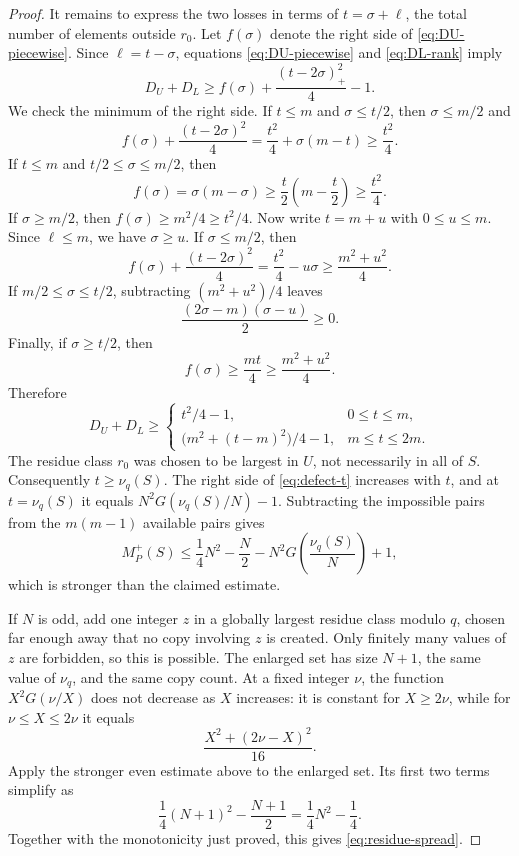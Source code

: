 \documentclass[11pt]{article}
\numberwithin{equation}{section}
\theoremstyle{remark}
\begin{document}
\begin{proof}
It remains to express the two losses in terms of
$t=\sigma+\ell$, the total number of elements outside $r_0$.  Let
$f(\sigma)$ denote the right side of \eqref{eq:DU-piecewise}.  Since
$\ell=t-\sigma$, equations \eqref{eq:DU-piecewise} and
\eqref{eq:DL-rank} imply
\[
 D_U+D_L\ge f(\sigma)+\frac{(t-2\sigma)_+^2}{4}-1.
\]
We check the minimum of the right side.
If $t\le m$ and $\sigma\le t/2$, then $\sigma\le m/2$ and
\[
 f(\sigma)+\frac{(t-2\sigma)^2}{4}
 =\frac{t^2}{4}+\sigma(m-t)\ge\frac{t^2}{4}.
\]
If $t\le m$ and $t/2\le\sigma\le m/2$, then
\[
 f(\sigma)=\sigma(m-\sigma)
 \ge \frac t2\left(m-\frac t2\right)
 \ge\frac{t^2}{4}.
\]
If $\sigma\ge m/2$, then $f(\sigma)\ge m^2/4\ge t^2/4$.
Now write $t=m+u$ with $0\le u\le m$.  Since $\ell\le m$, we have
$\sigma\ge u$.  If $\sigma\le m/2$, then
\[
 f(\sigma)+\frac{(t-2\sigma)^2}{4}
 =\frac{t^2}{4}-u\sigma
 \ge\frac{m^2+u^2}{4}.
\]
If $m/2\le\sigma\le t/2$, subtracting $(m^2+u^2)/4$ leaves
\[
 \frac{(2\sigma-m)(\sigma-u)}2\ge0.
\]
Finally, if $\sigma\ge t/2$, then
\[
 f(\sigma)\ge\frac{mt}{4}
 \ge\frac{m^2+u^2}{4}.
\]
Therefore
\begin{equation}\label{eq:defect-t}
 D_U+D_L\ge
 \begin{cases}
 t^2/4-1,&0\le t\le m,\\[1mm]
 \bigl(m^2+(t-m)^2\bigr)/4-1,&m\le t\le2m.
 \end{cases}
\end{equation}
The residue class $r_0$ was chosen to be largest in $U$, not necessarily in
all of $S$.  Consequently $t\ge\nu_q(S)$.  The right side of
\eqref{eq:defect-t} increases with $t$, and at $t=\nu_q(S)$ it equals
$N^2G(\nu_q(S)/N)-1$.  Subtracting the impossible pairs from the
$m(m-1)$ available pairs gives
\[
 M_P^+(S)
 \le \frac14N^2-\frac N2
      -N^2G\left(\frac{\nu_q(S)}N\right)+1,
\]
which is stronger than the claimed estimate.

If $N$ is odd, add one integer $z$ in a globally largest residue class
modulo $q$, chosen far enough away that no copy involving $z$ is created.
Only finitely many values of $z$ are forbidden, so this is possible.  The
enlarged set has size $N+1$, the same value of $\nu_q$, and the same copy
count.  At a fixed integer $\nu$, the function $X^2G(\nu/X)$ does not
decrease as $X$ increases: it is constant for $X\ge2\nu$, while for
$\nu\le X\le2\nu$ it equals
\[
 \frac{X^2+(2\nu-X)^2}{16}.
\]
Apply the stronger even estimate above to the enlarged set.  Its first two
terms simplify as
\[
 \frac14(N+1)^2-\frac{N+1}{2}=\frac14N^2-\frac14.
\]
Together with the monotonicity just proved, this gives
\eqref{eq:residue-spread}.
\end{proof}
\end{document}
